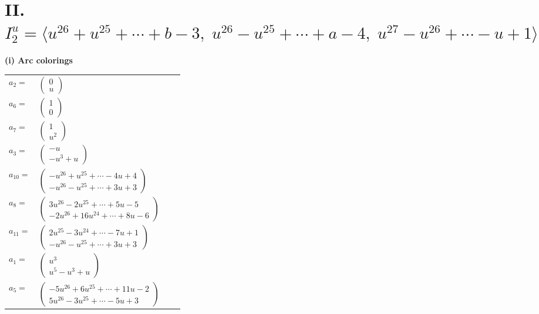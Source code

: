 \documentclass[1p]{elsarticle_modified}
\theoremstyle{definition}
\begin{document}
\centering \section*{II. $I^u_{2}= \langle u^{26}+u^{25}+\cdots+b-3,\;u^{26}- u^{25}+\cdots+a-4,\;u^{27}- u^{26}+\cdots- u+1 \rangle$}
\flushleft \textbf{(i) Arc colorings}\\
\begin{tabular}{m{7pt} m{180pt} m{7pt} m{180pt} }
\flushright $a_{2}=$&$\begin{pmatrix}0\\u\end{pmatrix}$ \\
\flushright $a_{6}=$&$\begin{pmatrix}1\\0\end{pmatrix}$ \\
\flushright $a_{7}=$&$\begin{pmatrix}1\\u^2\end{pmatrix}$ \\
\flushright $a_{3}=$&$\begin{pmatrix}- u\\- u^3+u\end{pmatrix}$ \\
\flushright $a_{10}=$&$\begin{pmatrix}- u^{26}+u^{25}+\cdots-4 u+4\\- u^{26}- u^{25}+\cdots+3 u+3\end{pmatrix}$ \\
\flushright $a_{8}=$&$\begin{pmatrix}3 u^{26}-2 u^{25}+\cdots+5 u-5\\-2 u^{26}+16 u^{24}+\cdots+8 u-6\end{pmatrix}$ \\
\flushright $a_{11}=$&$\begin{pmatrix}2 u^{25}-3 u^{24}+\cdots-7 u+1\\- u^{26}- u^{25}+\cdots+3 u+3\end{pmatrix}$ \\
\flushright $a_{1}=$&$\begin{pmatrix}u^3\\u^5- u^3+u\end{pmatrix}$ \\
\flushright $a_{5}=$&$\begin{pmatrix}-5 u^{26}+6 u^{25}+\cdots+11 u-2\\5 u^{26}-3 u^{25}+\cdots-5 u+3\end{pmatrix}$ \\

\end{tabular}
\end{document}
